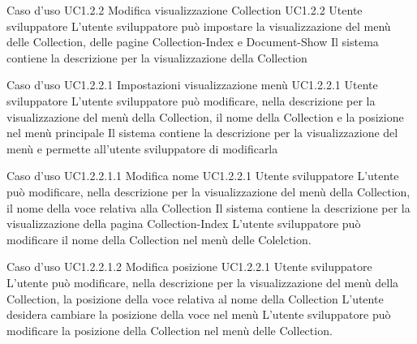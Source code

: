 \UCtitle
{Caso d'uso UC1.2.2}
{Modifica visualizzazione Collection}
\UC
{UC1.2.2}
{Utente sviluppatore}
{L'utente sviluppatore  può impostare la visualizzazione del menù delle Collection, delle pagine Collection-Index e Document-Show}
{Il sistema contiene la descrizione per la visualizzazione della Collection}

\UCtitle
{Caso d'uso UC1.2.2.1}
{Impostazioni visualizzazione menù}
\UC
{UC1.2.2.1}
{Utente sviluppatore}
{L'utente sviluppatore può modificare, nella descrizione per la visualizzazione del menù della Collection, il nome della Collection e la posizione nel menù principale}
{Il sistema contiene la descrizione per la visualizzazione del menù e permette all'utente sviluppatore di modificarla}


\UCtitle
{Caso d'uso UC1.2.2.1.1}
{Modifica nome}
\UC
{UC1.2.2.1}
{Utente sviluppatore}
{L'utente può modificare, nella descrizione per la visualizzazione del menù della Collection, il nome della voce relativa alla Collection}
{Il sistema contiene la descrizione per la visualizzazione della pagina Collection-Index}
\scenario
{L'utente sviluppatore può modificare il nome della Collection nel menù delle Colelction.}

\UCtitle
{Caso d'uso UC1.2.2.1.2}
{Modifica posizione}
\UC
{UC1.2.2.1}
{Utente sviluppatore}
{L'utente può modificare, nella descrizione per la visualizzazione del menù della Collection, la posizione della voce relativa al nome della Collection}
{L'utente desidera cambiare la posizione della voce nel menù}
\scenario
{L'utente sviluppatore può modificare la posizione della Collection nel menù delle Collection.}



